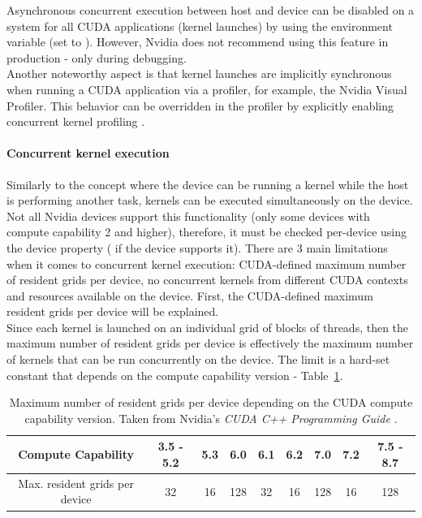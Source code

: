 Asynchronous concurrent execution between host and device can be disabled on a system for all CUDA applications (kernel launches) by using the  environment variable (set to ). However, Nvidia does not recommend using this feature in production - only during debugging. \\
Another noteworthy aspect is that kernel launches are implicitly synchronous when running a CUDA application via a profiler, for example, the Nvidia Visual Profiler. This behavior can be overridden in the profiler by explicitly enabling concurrent kernel profiling \cite{NVIDIAMay2022}.

\paragraph{Concurrent kernel execution}\label{Paragraph:theory-CUDA-asynchronous-concurrent-execution-concurrent-kernel-execution}
Similarly to the concept where the device can be running a kernel while the host is performing another task, kernels can be executed simultaneously on the device. Not all Nvidia devices support this functionality (only some devices with compute capability 2 and higher), therefore, it must be checked per-device using the  device property ( if the device supports it). There are 3 main limitations when it comes to concurrent kernel execution: CUDA-defined maximum number of resident grids per device, no concurrent kernels from different CUDA contexts and resources available on the device. First, the CUDA-defined maximum resident grids per device will be explained. \\
Since each kernel is launched on an individual grid of blocks of threads, then the maximum number of resident grids per device is effectively the maximum number of kernels that can be run concurrently on the device. The limit is a hard-set constant that depends on the compute capability version - Table~\ref{Table:theory-CUDA-maximum-resident-grids-per-device}.

\begin{table}[ht!]
	\centering
	\renewcommand{\arraystretch}{1.5}
	\begin{tabular}{ |c|c|c|c|c|c|c|c|c| } 
		\hline
		Compute Capability & 3.5 - 5.2 & 5.3 & 6.0 & 6.1 & 6.2 & 7.0 & 7.2 & 7.5 - 8.7 \\
		\hline
		Max. resident grids per device & 32 & 16 & 128 & 32 & 16 & 128 & 16 & 128 \\
		\hline
	\end{tabular}
	\caption{Maximum number of resident grids per device depending on the CUDA compute capability version. Taken from Nvidia's \emph{CUDA C++ Programming Guide} \cite{NVIDIAMay2022}.}
	\label{Table:theory-CUDA-maximum-resident-grids-per-device}
\end{table}

